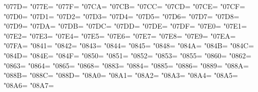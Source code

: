 \XeTeXcharclass"077D=\KclassArabD
\XeTeXcharclass"077E=\KclassArabD
\XeTeXcharclass"077F=\KclassArabD
\XeTeXcharclass"07CA=\KclassArabD
\XeTeXcharclass"07CB=\KclassArabD
\XeTeXcharclass"07CC=\KclassArabD
\XeTeXcharclass"07CD=\KclassArabD
\XeTeXcharclass"07CE=\KclassArabD
\XeTeXcharclass"07CF=\KclassArabD
\XeTeXcharclass"07D0=\KclassArabD
\XeTeXcharclass"07D1=\KclassArabD
\XeTeXcharclass"07D2=\KclassArabD
\XeTeXcharclass"07D3=\KclassArabD
\XeTeXcharclass"07D4=\KclassArabD
\XeTeXcharclass"07D5=\KclassArabD
\XeTeXcharclass"07D6=\KclassArabD
\XeTeXcharclass"07D7=\KclassArabD
\XeTeXcharclass"07D8=\KclassArabD
\XeTeXcharclass"07D9=\KclassArabD
\XeTeXcharclass"07DA=\KclassArabD
\XeTeXcharclass"07DB=\KclassArabD
\XeTeXcharclass"07DC=\KclassArabD
\XeTeXcharclass"07DD=\KclassArabD
\XeTeXcharclass"07DE=\KclassArabD
\XeTeXcharclass"07DF=\KclassArabD
\XeTeXcharclass"07E0=\KclassArabD
\XeTeXcharclass"07E1=\KclassArabD
\XeTeXcharclass"07E2=\KclassArabD
\XeTeXcharclass"07E3=\KclassArabD
\XeTeXcharclass"07E4=\KclassArabD
\XeTeXcharclass"07E5=\KclassArabD
\XeTeXcharclass"07E6=\KclassArabD
\XeTeXcharclass"07E7=\KclassArabD
\XeTeXcharclass"07E8=\KclassArabD
\XeTeXcharclass"07E9=\KclassArabD
\XeTeXcharclass"07EA=\KclassArabD
\XeTeXcharclass"07FA=\KclassArabD
\XeTeXcharclass"0841=\KclassArabD
\XeTeXcharclass"0842=\KclassArabD
\XeTeXcharclass"0843=\KclassArabD
\XeTeXcharclass"0844=\KclassArabD
\XeTeXcharclass"0845=\KclassArabD
\XeTeXcharclass"0848=\KclassArabD
\XeTeXcharclass"084A=\KclassArabD
\XeTeXcharclass"084B=\KclassArabD
\XeTeXcharclass"084C=\KclassArabD
\XeTeXcharclass"084D=\KclassArabD
\XeTeXcharclass"084E=\KclassArabD
\XeTeXcharclass"084F=\KclassArabD
\XeTeXcharclass"0850=\KclassArabD
\XeTeXcharclass"0851=\KclassArabD
\XeTeXcharclass"0852=\KclassArabD
\XeTeXcharclass"0853=\KclassArabD
\XeTeXcharclass"0855=\KclassArabD
\XeTeXcharclass"0860=\KclassArabD
\XeTeXcharclass"0862=\KclassArabD
\XeTeXcharclass"0863=\KclassArabD
\XeTeXcharclass"0864=\KclassArabD
\XeTeXcharclass"0865=\KclassArabD
\XeTeXcharclass"0868=\KclassArabD
\XeTeXcharclass"0883=\KclassArabD
\XeTeXcharclass"0884=\KclassArabD
\XeTeXcharclass"0885=\KclassArabD
\XeTeXcharclass"0886=\KclassArabD
\XeTeXcharclass"0889=\KclassArabD
\XeTeXcharclass"088A=\KclassArabD
\XeTeXcharclass"088B=\KclassArabD
\XeTeXcharclass"088C=\KclassArabD
\XeTeXcharclass"088D=\KclassArabD
\XeTeXcharclass"08A0=\KclassArabD
\XeTeXcharclass"08A1=\KclassArabD
\XeTeXcharclass"08A2=\KclassArabD
\XeTeXcharclass"08A3=\KclassArabD
\XeTeXcharclass"08A4=\KclassArabD
\XeTeXcharclass"08A5=\KclassArabD
\XeTeXcharclass"08A6=\KclassArabD
\XeTeXcharclass"08A7=\KclassArabD
